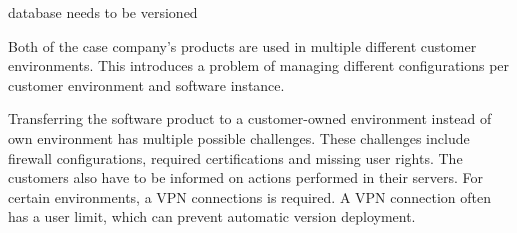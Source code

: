 \documentclass[english]{tktltiki2}
\theoremstyle{definition}
\theoremstyle{remark}
\begin{document}

database needs to be versioned

Both of the case company's products are used in multiple different customer environments. This introduces a problem of managing different configurations per customer environment and software instance. 


Transferring the software product to a customer-owned environment instead of own environment has multiple possible challenges. These challenges include firewall configurations, required certifications and missing user rights. The customers also have to be informed on actions performed in their servers. For certain environments, a VPN connections is required. A VPN connection often has a user limit, which can prevent automatic version deployment.






\end{document}
